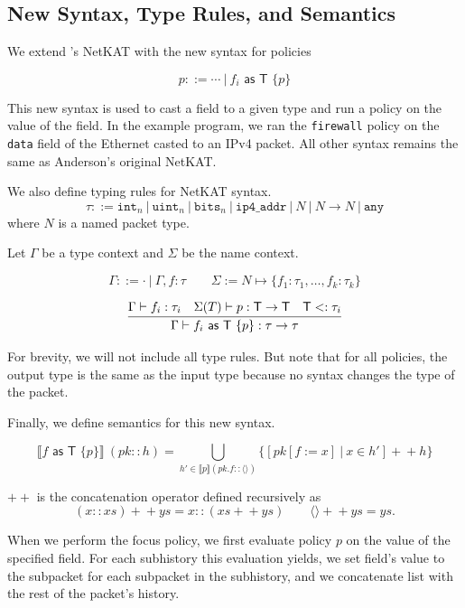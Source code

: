 \documentclass[acmsmall,screen,nonacm]{acmart}
\def\concat{+\!\!+}
\begin{document}
\subsection{New Syntax, Type Rules, and Semantics}

We extend \citet{anderson2014netkat}'s NetKAT with the new syntax for
policies

\[
  p ::= \cdots\ |\ f_i \textsf{ as T }  \{ p \}
\]

This new syntax is used to cast a field to a given type and run a policy
on the value of the field. In the example program, we ran the 
\texttt{firewall} policy on the \texttt{data} field of the Ethernet
casted to an IPv4 packet. All other syntax remains the same as
Anderson's original NetKAT.

We also define typing rules for NetKAT syntax. 
\[ \tau ::= \mathtt{int}_n\ |\ \mathtt{uint}_n\ |\ \mathtt{bits}_n\ |\ \mathtt{ip4\_addr}\ |\ N\ |\ N \to N\ |\ \mathtt{any} \]
where $N$ is a named packet type.

Let $\Gamma$ be a type context and $\Sigma$ be the name context.

\[
  \Gamma ::= \cdot\ |\ \Gamma, f: \tau \qquad \Sigma := N \mapsto \{f_1: \tau_1, \dots, f_k: \tau_k\}
\]

\[
  \infer{\Gamma \vdash f_i \textsf{ as T } \{ p \}: \tau \to \tau}{\Gamma \vdash f_i: \tau_i & \Sigma(T) \vdash p: \mathsf{T} \to \mathsf{T} & \mathsf{T} <: \tau_i}
\]

For brevity, we will not include all type rules. But note that for all policies,
the output type is the same as the input type because no syntax changes the
type of the packet.

Finally, we define semantics for this new syntax.

\[ \llbracket f \textsf{ as T } \{ p \} \rrbracket\ (pk::h) = \bigcup_{h' \in \llbracket p \rrbracket(pk.f::\langle\rangle) } \{ [pk[f := x]\ |\ x \in h'] \concat h \} \]

$\concat$ is the concatenation operator defined recursively as
\[ (x::xs) \concat ys = x :: (xs \concat ys) \qquad \langle\rangle \concat ys = ys. \]

When we perform the focus policy, we first evaluate policy $p$ on the 
value of the specified field. For each subhistory this evaluation yields, 
we set field's value to the subpacket for each subpacket in the 
subhistory, and we concatenate list with the rest of the packet's history.

\end{document}
